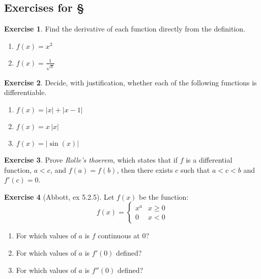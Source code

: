 \documentclass[11pt,oneside]{amsbook}
\theoremstyle{definition}
\newtheorem{exerc}{Exercise}[section]
\theoremstyle{plain}
\theoremstyle{definition}
\theoremstyle{remark}
\numberwithin{equation}{section}
\numberwithin{figure}{section}
\begin{document}

\newpage
\subsection*{Exercises for \S \thesection}

\begin{exerc}
  Find the derivative of each function directly from the definition.
  \begin{enumerate}
    \item $\displaystyle f(x)=x^3$
    \item $\displaystyle f(x)=\frac{1}{\sqrt{x}}$
  \end{enumerate}
\end{exerc}

\begin{exerc}
  Decide, with justification, whether each of the following functions is differentiable.
  \begin{enumerate}
    \item $\displaystyle f(x)=|x|+|x-1|$
    \item $\displaystyle f(x)=x\,|x|$
    \item $\displaystyle f(x)=|\sin(x)|$
  \end{enumerate}
\end{exerc}
  

\begin{exerc}
  Prove \emph{Rolle's thoerem}, which states that if $f$ is a differential function, $a<c$, and $f(a)=f(b)$, then there exists $c$ such that $a<c<b$ and $f'(c)=0$.
\end{exerc}

\begin{exerc}[Abbott, ex 5.2.5]
  Let $f(x)$ be the function:
  \[f(x)=\begin{cases}x^a&x\geq0\\0&x<0\end{cases}\]
  \begin{enumerate}
    \item For which values of $a$ is $f$ continuous at $0$?
    \item For which values of $a$ is $f'(0)$ defined?
    \item For which values of $a$ is $f''(0)$ defined?
  \end{enumerate}
\end{exerc}
\end{document}
